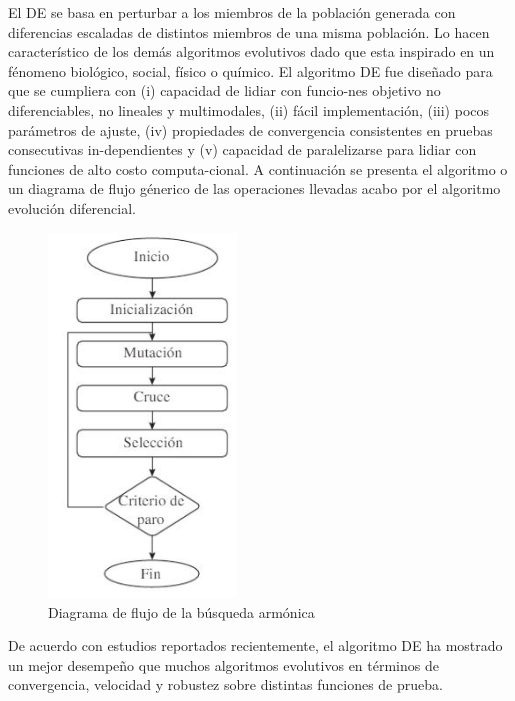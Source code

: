 \documentclass{article}
\begin{document}
El DE se basa en perturbar a los miembros de la poblaci\'on generada con diferencias escaladas de distintos miembros de una misma poblaci\'on. Lo hacen caracter\'istico de los dem\'as algoritmos evolutivos dado que esta inspirado en un f\'enomeno biol\'ogico, social, f\'isico o qu\'imico. El algoritmo DE fue dise\~nado para que se cumpliera con (i) capacidad de lidiar con funcio-nes objetivo no diferenciables, no lineales y multimodales, (ii) fácil implementación, (iii) pocos parámetros de ajuste, (iv) propiedades de convergencia consistentes en pruebas consecutivas in-dependientes y (v) capacidad de paralelizarse para lidiar con funciones de alto costo computa-cional. A continuaci\'on se presenta el algoritmo o un diagrama de flujo g\'enerico de las operaciones llevadas acabo por el algoritmo evoluci\'on diferencial.
\begin{figure}[h!]
    \centering
    \includegraphics[width=5cm]{imgs/Evolucion diferencial.JPG}
    \caption{Diagrama de flujo de la búsqueda armónica}
    \label{fig:my_label}
\end{figure}
De acuerdo con estudios reportados recientemente, el algoritmo DE ha mostrado un mejor desempe\~no que muchos algoritmos evolutivos en t\'erminos de convergencia, velocidad y robustez sobre distintas funciones de prueba.
\end{document}
